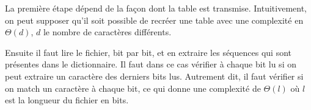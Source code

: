 \documentclass[10pt,a4paper]{article}
\begin{document}
	La première étape dépend de la façon dont la table est transmise. Intuitivement, on peut supposer qu'il soit possible de recréer une table avec une complexité en $\Theta(d)$, $d$ le nombre de caractères différents.
	
	Ensuite il faut lire le fichier, bit par bit, et en extraire les séquences qui sont présentes dans le dictionnaire.
	Il faut dans ce cas vérifier à chaque bit lu si on peut extraire un caractère des derniers bits lus. Autrement dit, il faut vérifier si on match un caractère à chaque bit, ce qui donne une complexité de $\Theta(l)$ où $l$ est la longueur du fichier en bits.


\end{document}
